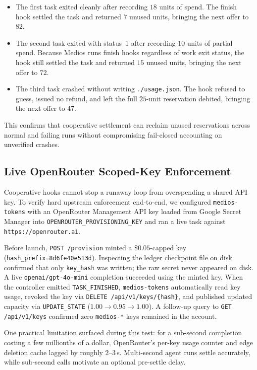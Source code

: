 \documentclass[11pt]{article}
\begin{document}
\begin{itemize}
  \item The first task exited cleanly after recording $18$ units of spend. The finish hook settled the task and returned $7$ unused units, bringing the next offer to $82$.
  \item The second task exited with status~1 after recording $10$ units of partial spend. Because Medios runs finish hooks regardless of work exit status, the hook still settled the task and returned $15$ unused units, bringing the next offer to $72$.
  \item The third task crashed without writing \texttt{./usage.json}. The hook refused to guess, issued no refund, and left the full $25$-unit reservation debited, bringing the next offer to $47$.
\end{itemize}

This confirms that cooperative settlement can reclaim unused reservations across normal and failing runs without compromising fail-closed accounting on unverified crashes.

\subsection{Live OpenRouter Scoped-Key Enforcement}
Cooperative hooks cannot stop a runaway loop from overspending a shared API key. To verify hard upstream enforcement end-to-end, we configured \texttt{medios-tokens} with an OpenRouter Management API key loaded from Google Secret Manager into \texttt{OPENROUTER\_PROVISIONING\_KEY} and ran a live task against \texttt{https://openrouter.ai}.

Before launch, \texttt{POST /provision} minted a $\$0.05$-capped key (\texttt{hash\_prefix=8d6fe40e513d}). Inspecting the ledger checkpoint file on disk confirmed that only \texttt{key\_hash} was written; the raw secret never appeared on disk. A live \texttt{openai/gpt-4o-mini} completion succeeded using the minted key. When the controller emitted \texttt{TASK\_FINISHED}, \texttt{medios-tokens} automatically read key usage, revoked the key via \texttt{DELETE /api/v1/keys/\{hash\}}, and published updated capacity via \texttt{UPDATE\_STATE} ($1.00 \rightarrow 0.95 \rightarrow 1.00$). A follow-up query to \texttt{GET /api/v1/keys} confirmed zero \texttt{medios-*} keys remained in the account.

One practical limitation surfaced during this test: for a sub-second completion costing a few millionths of a dollar, OpenRouter's per-key usage counter and edge deletion cache lagged by roughly $2\text{--}3$\,s. Multi-second agent runs settle accurately, while sub-second calls motivate an optional pre-settle delay.
\end{document}
